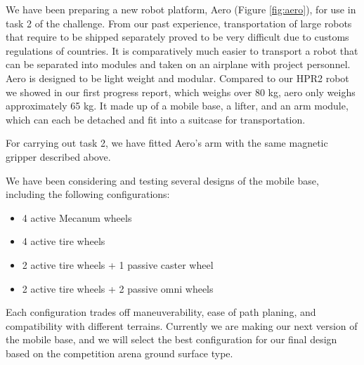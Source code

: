 \documentclass{standalone}
\begin{document}
We have been preparing a new robot platform, Aero (Figure
\ref{fig:aero}), for use in task 2 of the challenge. From our past
experience, transportation of large robots that require to be shipped
separately proved to be very difficult due to customs regulations of
countries. 
It is comparatively much easier to transport a robot that
can be separated into modules and taken on an airplane with project personnel.
Aero is
designed to be light weight and modular. Compared to our HPR2 robot we
showed in our first progress report, which weighs over 80 kg, aero
only weighs approximately 65 kg. It made up of a mobile base, a
lifter, and an arm module, which can each be detached and fit into a
suitcase for transportation. 

For carrying out task 2, we have fitted Aero's arm with the same
magnetic gripper %
described above. 

We have been considering and testing several designs of the mobile base, including the following configurations:
\begin{itemize}
	\item 4 active Mecanum wheels 
	\item 4 active tire wheels
	\item 2 	active tire wheels + 1 passive caster wheel
	\item 2 	active tire wheels + 2 passive omni wheels
\end{itemize}

Each configuration trades off maneuverability, ease of path planing,
and compatibility with different terrains. Currently we are making our
next version of the mobile base, and we will select the best
configuration for our final design based on the competition arena
ground surface type. 
\end{document}
